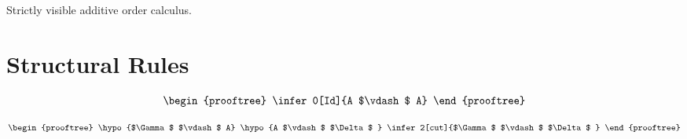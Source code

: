 





\usepackage[utf8]{inputenc}





















Strictly visible additive order calculus.


\section{Structural Rules}

\begin{center}
	\[
	\begin{prooftree}
	\infer0[Id]{A $\vdash$  A}
	\end{prooftree}
	\]
	
	\[
	\begin{prooftree}
	\hypo{$\Gamma$  $\vdash$  A}
	\hypo{A $\vdash$  $\Delta$ }
	\infer2[cut]{$\Gamma$  $\vdash$  $\Delta$ }
	\end{prooftree}
	\]
\end{center}

